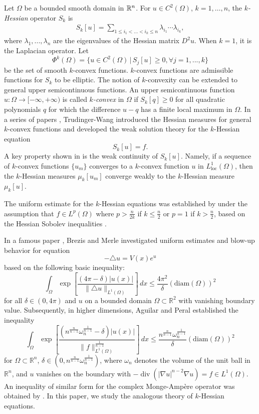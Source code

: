\documentclass[11pt]{amsart}
\numberwithin{equation}{section}
\numberwithin{equation}{section}
\def\R{{\bf\mathbb R} }
\begin{document}
Let $\Omega$ be a bounded smooth domain in $\R^n$. For $u\in C^2(\Omega)$, $k=1,\dots, n$, the {\it $k$-Hessian} operator $S_k$ is 
\begin{align}
S_k[u]=\sum_{1\le i_1<...<i_k\le n}\lambda_{i_1}\cdots\lambda_{i_k}, \nonumber
\end{align}
where $\lambda_1,...,\lambda_n$ are the eigenvalues of the Hessian matrix $D^2u$. When $k=1$, it is the Laplacian operator.
Let 
\[\Phi^k(\Omega)=\{u\in C^2(\Omega)\, | \, S_j[u]\ge 0 ,  \forall j=1,...,k\}\]
be the set of smooth $k$-convex functions. $k$-convex functions are admissible functions
for $S_k$ to be elliptic.
 The notion of $k$-convexity can be extended to general upper semicontinuous functions.
An upper semicontinuous function $u:\Omega \to [-\infty, +\infty)$ is called {\it $k$-convex} in $\Omega$ if $S_k[q]\geq 0$ for all quadratic polynomials $q$ for which the diﬀerence $u-q$ has a finite local maximum in $\Omega$.
In a series of papers \cites{TW97, TW99, TW02}, Trudinger-Wang introduced the Hessian measures for general $k$-convex functions and
developed the weak solution theory for the $k$-Hessian equation
\begin{equation}\label{k-hess-eq}
S_k[u]=f.
\end{equation}
A key property shown in  \cite{TW99} is the weak continuity of $S_k[u]$. Namely, if a sequence of $k$-convex functions $\{u_m\}$ converges  to a $k$-convex function $u$ in $L^1_{\text{loc}}(\Omega)$, then the $k$-Hessian measures $\mu_k[u_m]$ converge weakly to the $k$-Hessian measure $\mu_k[u]$.

The uniform estimate for the  $k$-Hessian equations was established by \cite{CW01} under the assumption that 
$f\in L^p(\Omega)$ where $p>\frac{n}{2k}$ if $k\leq \frac{n}{2}$ or $p=1$ if $k>\frac{n}{2}$,
 based on the Hessian Sobolev inequalities \cites{Wan94, Wan09}.

In a famous paper \cite{BM91}, Brezis and Merle investigated uniform estimates and blow-up behavior 
for equation
\[-\triangle u=V(x) e^u\]
based on the following basic inequality:
\[\int_\Omega \exp\left[\frac{(4\pi-\delta) |u(x)| }{\|\triangle u\|_{L^1(\Omega)}}\right]\,dx\leq \frac{4\pi^2}{\delta}(\mathrm{diam}(\Omega))^2\]
for all $\delta\in (0,4\pi)$ and $u$ on a bounded domain $\Omega\subset\mathbb R^2$ with vanishing boundary value. Subsequently, in higher dimensions, Aguilar and Peral \cite{AP94} established the inequality
\[\int_\Omega \exp\left[\frac{(n^{\frac{n}{n-1}}\omega_{n}^{\frac{1}{n-1}}-\delta) |u(x)| }{\|f\|^{\frac{1}{n-1}}_{L^1(\Omega)}}\right]\,dx\leq \frac{n^{\frac{n}{n-1}}\omega_{n}^{\frac{1}{n-1}}}{\delta}(\mathrm{diam}(\Omega))^2\]
for $\Omega \subset \mathbb{R}^n$, $\delta \in (0, n^{\frac{n}{n-1}}\omega_{n}^{\frac{1}{n-1}})$, where $\omega_n$ denotes the volume of the unit ball in $\mathbb{R}^n$, and $u$ vanishes on the boundary with $-\operatorname{div}(|\nabla u|^{n-2}\nabla u) = f \in L^1(\Omega)$.
An inequality of similar form for the complex Monge-Amp\`ere operator was obtained by \cites{De09, AC09, BB}.
In this paper, we study the analogous theory of $k$-Hessian equations.
\end{document}
